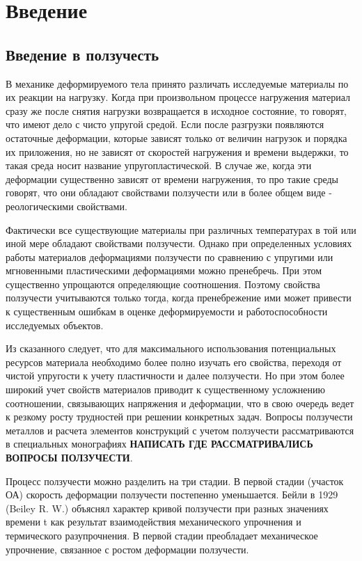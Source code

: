 \chapter{Введение}


\section{Введение в ползучесть}
В механике деформируемого тела принято различать исследуемые материалы по их 
реакции на нагрузку. Когда при произвольном процессе нагружения материал сразу же после
снятия нагрузки возвращается в исходное состояние, то говорят, что имеют дело с чисто 
упругой средой. Если после разгрузки появляются остаточные деформации, которые зависят
только от величин нагрузок и порядка их приложения, но не зависят от
скоростей нагружения и времени выдержки, то такая среда носит название 
упругопластической.
В случае же, когда эти деформации существенно зависят от времени нагружения, то про такие 
среды говорят, что они обладают свойствами ползучести или в более общем виде - реологическими
свойствами.

Фактически все существующие материалы при различных температурах в той или иной мере 
обладают свойствами ползучести. Однако при определенных условиях работы материалов 
деформациями ползучести по сравнению с упругими или мгновенными пластическими 
деформациями можно пренебречь. При этом существенно упрощаются определяющие соотношения. 
Поэтому свойства ползучести учитываются только тогда, когда пренебрежение ими может 
привести к существенным ошибкам в оценке деформируемости и работоспособности исследуемых 
объектов.

Из сказанного следует, что для максимального использования потенциальных ресурсов 
материала необходимо более полно изучать его свойства, переходя от чистой упругости к 
учету пластичности и далее ползучести. Но при этом более широкий учет свойств материалов 
приводит к существенному усложнению соотношении, связывающих напряжения и деформации, что 
в свою очередь ведет к резкому росту трудностей при решении конкретных задач.
Вопросы ползучести металлов и расчета элементов конструкций с учетом ползучести 
рассматриваются в специальных монографиях \textbf{НАПИСАТЬ ГДЕ РАССМАТРИВАЛИСЬ ВОПРОСЫ 
ПОЛЗУЧЕСТИ}.

Процесс ползучести можно разделить на три стадии. В первой стадии (участок 	
ОА) скорость деформации ползучести постепенно уменьшается. Бейли в 1929 
(Beiley R. W.) объяснял характер кривой ползучести при разных значениях 
времени t как результат взаимодействия механического упрочнения и 
термического разупрочнения. В первой стадии преобладает механическое 
упрочнение, связанное с ростом деформации ползучести.
			

